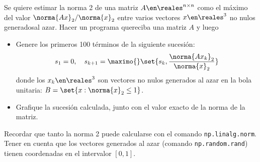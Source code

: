 \begin{enunciado}{\ejercicio}
  Se quiere estimar la norma 2 de una matriz $A \en \reales^{n \times n}$ como el máximo del valor
  $ \norma{Ax}_2 / \norma{x}_2 $ entre varios vectores $x \en \reales^3$ no nulos generadosal azar.
  Hacer un programa quereciba una matriz $A$ y luego
  \begin{itemize}
    \item Genere los primeros 100 términos de la siguiente sucesión:
          $$
            s_1 = 0, \quad s_{k+1} = \maximo{}\set{s_k, \frac{\norma{Ax_k}_2}{\norma{x}_2}}
          $$
          donde los $x_k \en \reales^3$ son vectores no nulos generados al azar en la bola unitaria:
          $B = \set{x : \norma{x}_2 \leq 1}$.

    \item Grafique la sucesión calculada, junto con el valor exacto de la norma de la matriz.
  \end{itemize}

  Recordar que tanto la norma 2 puede calcularse con el comando \texttt{np.linalg.norm}. Tener en cuenta
  que los vectores generados al azar (comando \texttt{np.random.rand}) tienen coordenadas en el intervalor $[0,1]$.
\end{enunciado}


